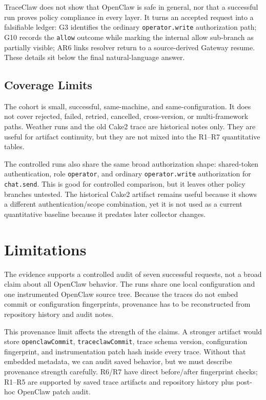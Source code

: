 \documentclass[11pt,a4paper]{article}
\begin{document}
TraceClaw does not show that OpenClaw is safe in general, nor that a
successful run proves policy compliance in every layer. It turns an
accepted request into a falsifiable ledger: G3 identifies the ordinary
\texttt{operator.write} authorization path; G10 records the
\texttt{allow} outcome while marking the internal allow sub-branch as
partially visible; AR6 links resolver return to a source-derived Gateway
resume. These details sit below the final natural-language answer.

\subsection{Coverage Limits}

The cohort is small, successful, same-machine, and same-configuration. It
does not cover rejected, failed, retried, cancelled, cross-version, or
multi-framework paths. Weather runs and the old Cake2 trace are historical
notes only. They are useful for artifact continuity, but they are not
mixed into the R1--R7 quantitative tables.

The controlled runs also share the same broad authorization shape:
shared-token authentication, role \texttt{operator}, and ordinary
\texttt{operator.write} authorization for \texttt{chat.send}. This is
good for controlled comparison, but it leaves other policy branches
untested. The historical Cake2 artifact remains useful because it shows a
different authentication/scope combination, yet it is not used as a
current quantitative baseline because it predates later collector
changes.

\section{Limitations}
\label{sec:limitations}

The evidence supports a controlled audit of seven successful requests,
not a broad claim about all OpenClaw behavior. The runs share one local
configuration and one instrumented OpenClaw source tree. Because the
traces do not embed commit or configuration fingerprints, provenance has
to be reconstructed from repository history and audit notes.

This provenance limit affects the strength of the claims. A stronger
artifact would store \texttt{openclawCommit}, \texttt{traceclawCommit},
trace schema version, configuration fingerprint, and instrumentation
patch hash inside every trace. Without that embedded metadata, we can
audit saved behavior, but we must describe provenance strength carefully.
R6/R7 have direct before/after fingerprint checks; R1--R5 are supported
by saved trace artifacts and repository history plus post-hoc OpenClaw
patch audit.
\end{document}
